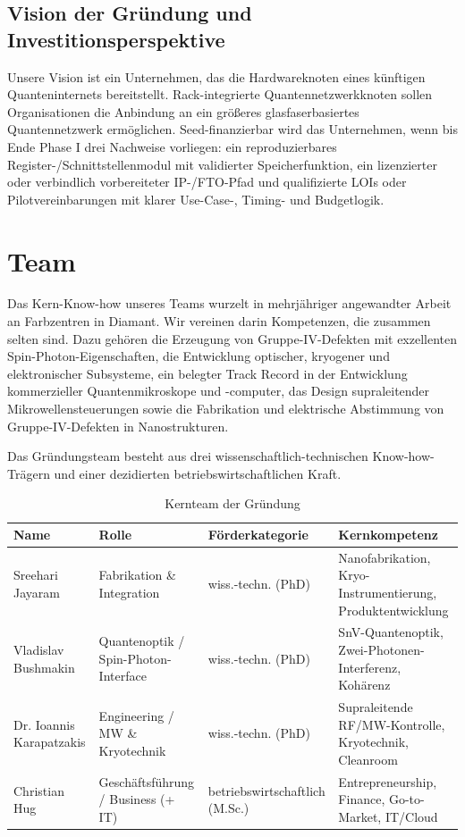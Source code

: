 \documentclass[11pt,oneside]{scrartcl}
\begin{document}
\subsection{Vision der Gr\"undung und Investitionsperspektive}
Unsere Vision ist ein Unternehmen, das die Hardwareknoten eines k\"unftigen Quanteninternets bereitstellt. Rack-integrierte Quantennetzwerkknoten sollen Organisationen die Anbindung an ein gr\"o\ss eres glasfaserbasiertes Quantennetzwerk erm\"oglichen. Seed-finanzierbar wird das Unternehmen, wenn bis Ende Phase I drei Nachweise vorliegen: ein reproduzierbares Register-/Schnittstellenmodul mit validierter Speicherfunktion, ein lizenzierter oder verbindlich vorbereiteter IP-/FTO-Pfad und qualifizierte LOIs oder Pilotvereinbarungen mit klarer Use-Case-, Timing- und Budgetlogik.

\section{Team}
Das Kern-Know-how unseres Teams wurzelt in mehrj\"ahriger angewandter Arbeit an Farbzentren in Diamant. Wir vereinen darin Kompetenzen, die zusammen selten sind. Dazu geh\"oren die Erzeugung von Gruppe-IV-Defekten mit exzellenten Spin-Photon-Eigenschaften, die Entwicklung optischer, kryogener und elektronischer Subsysteme, ein belegter Track Record in der Entwicklung kommerzieller Quantenmikroskope und -computer, das Design supraleitender Mikrowellensteuerungen sowie die Fabrikation und elektrische Abstimmung von Gruppe-IV-Defekten in Nanostrukturen.

Das Gr\"undungsteam besteht aus drei wissenschaftlich-technischen Know-how-Tr\"agern und einer dezidierten betriebswirtschaftlichen Kraft.

\begin{table}[ht]
\centering
\small
\begin{tabularx}{\textwidth}{>{\raggedright\arraybackslash}p{} >{\raggedright\arraybackslash}p{} X X}
\toprule
Name & Rolle & Förderkategorie & Kernkompetenz \\
\midrule
Sreehari Jayaram & Fabrikation \& Integration & wiss.-techn. (PhD) & Nanofabrikation, Kryo-Instrumentierung, Produktentwicklung \\
Vladislav Bushmakin & Quantenoptik / Spin-Photon-Interface & wiss.-techn. (PhD) & SnV-Quantenoptik, Zwei-Photonen-Interferenz, Koh\"arenz \\
Dr. Ioannis Karapatzakis & Engineering / MW \& Kryotechnik & wiss.-techn. (PhD) & Supraleitende RF/MW-Kontrolle, Kryotechnik, Cleanroom \\
Christian Hug & Gesch\"aftsf\"uhrung / Business (+ IT) & betriebswirtschaftlich (M.Sc.) & Entrepreneurship, Finance, Go-to-Market, IT/Cloud \\
\bottomrule
\end{tabularx}
\caption{Kernteam der Gr\"undung}
\end{table}
\end{document}
